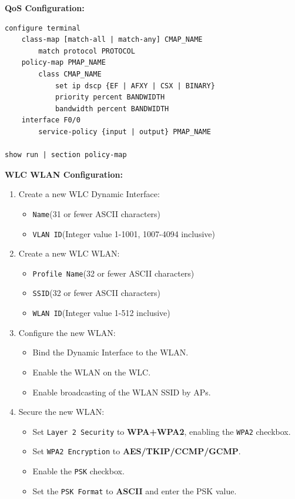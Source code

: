 \documentclass[12pt]{article}
\begin{document}
	\textbf{QoS Configuration:}
	\begin{lstlisting}
configure terminal
	class-map [match-all | match-any] CMAP_NAME
		match protocol PROTOCOL
	policy-map PMAP_NAME
		class CMAP_NAME
			set ip dscp {EF | AFXY | CSX | BINARY}
			priority percent BANDWIDTH
			bandwidth percent BANDWIDTH
	interface F0/0
		service-policy {input | output} PMAP_NAME
		
show run | section policy-map
	\end{lstlisting}

	\textbf{WLC WLAN Configuration:}
	\begin{enumerate}
		\item{Create a new WLC Dynamic Interface:}
		\begin{itemize} \itemsep -5pt
			\item{\texttt{Name}\hfill(31 or fewer ASCII characters)}
			\item{\texttt{VLAN ID}\hfill(Integer value 1-1001, 1007-4094 inclusive)}
		\end{itemize}
		\item{Create a new WLC WLAN:}
		\begin{itemize} \itemsep -5pt
			\item{\texttt{Profile Name}\hfill(32 or fewer ASCII characters)}
			\item{\texttt{SSID}\hfill(32 or fewer ASCII characters)}
			\item{\texttt{WLAN ID}\hfill(Integer value 1-512 inclusive)}
		\end{itemize}
		\item{Configure the new WLAN:}
		\begin{itemize} \itemsep -5pt
			\item{Bind the Dynamic Interface to the WLAN.}
			\item{Enable the WLAN on the WLC.}
			\item{Enable broadcasting of the WLAN SSID by APs.}
		\end{itemize}
		\item{Secure the new WLAN:}
		\begin{itemize} \itemsep -5pt
			\item{Set \texttt{Layer 2 Security} to \textbf{WPA+WPA2}, enabling the \texttt{WPA2} checkbox.}
			\item{Set \texttt{WPA2 Encryption} to \textbf{AES/TKIP/CCMP/GCMP}.}
			\item{Enable the \texttt{PSK} checkbox.}
			\item{Set the \texttt{PSK Format} to \textbf{ASCII} and enter the PSK value.}
		\end{itemize}
	\end{enumerate}

\end{document}
